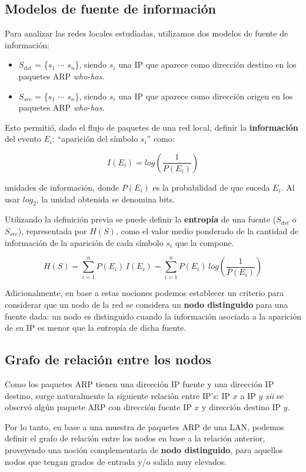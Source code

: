 \subsection{Modelos de fuente de información}
\label{subsec:modelos-fuente-informacion}

Para analizar las redes locales estudiadas, utilizamos dos modelos de fuente de información:
\vspace*{-2mm}

\begin{itemize}
  \item $S_{dst}$ = \{$s_1$ $\cdots$ $s_n$\}, siendo $s_i$ una IP que aparece como dirección destino en los paquetes ARP \emph{who-has}.
  \item $S_{src}$ = \{$s_1$ $\cdots$ $s_n$\}, siendo $s_i$ una IP que aparece como dirección origen en los paquetes ARP \emph{who-has}.
\end{itemize}

Esto permitió, dado el flujo de paquetes de una red local, definir la \textbf{información} del evento $E_i$: ``aparición del símbolo $s_i$'' como:

$$I (E_i) = log\left(\frac{1}{P(E_i)}\right)$$

unidades de información, donde $P(E_i)$ es la probabilidad de que suceda $E_i$. Al usar $log_2$, la unidad obtenida se denomina bits.

Utilizando la definición previa se puede definir la \textbf{entropía} de una fuente ($S_{dst}$ o $S_{src}$), representada por $H(S)$, como el valor medio ponderado de la cantidad de información de la aparición de cada símbolo $s_i$ que la compone.

$$H(S) = \sum_{i=1}^{n} P(E_i)\,I(E_i) = \sum_{i=1}^{n} P(E_i)\,log\left(\frac{1}{P(E_i)}\right)$$

Adicionalmente, en base a estas nociones podemos establecer un criterio para considerar que un nodo de la red se considera un \textbf{nodo distinguido} para una fuente dada: un nodo es distinguido cuando la información asociada a la aparición de su IP es menor que la entropía de dicha fuente.

\subsection{Grafo de relación entre los nodos}
\label{subsec:grafo-relacion-nodos}

Como los paquetes ARP tienen una dirección IP fuente y una dirección IP destino, surge naturalmente la siguiente relación entre IP's: IP $x$ a IP $y$ \emph{sii} se observó algún paquete ARP con dirección fuente IP $x$ y dirección destino IP $y$.

Por lo tanto, en base a una muestra de paquetes ARP de una LAN, podemos definir el grafo de relación entre los nodos en base a la relación anterior, proveyendo una noción complementaria de \textbf{nodo distinguido}, para aquellos nodos que tengan grados de entrada y/o salida muy elevados.